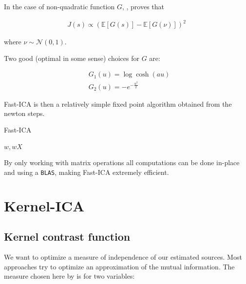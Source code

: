 \documentclass[a4paper,BCOR=5mm,oneside,openany]{scrreprt}
\newcommand*\diag{\mathop{}\!\mathrm{diag}}
\begin{document}
In the case of non-quadratic function $G$, \cite{Hyvarinen1998}, proves that 

\begin{align*}
	J(s) \propto \left( \mathbb{E} \left[G(s) \right] - \mathbb{E} \left[ G(\nu) \right] \right)^2
\end{align*}

where $\nu \sim \mathcal{N}(0,1)$.

Two good (optimal in some sense) choices for $G$ are:

\begin{align*}
	&G_1 (u) = \log \cosh (a u) \\
	&G_2 (u) = −e^{-\frac{u^2}{2}}
\end{align*}

Fast-ICA is then a relatively simple fixed point algorithm obtained from the newton steps.

\begin{algorithm}
\caption{Fast-ICA} \label{fastica}
\begin{algorithmic}
    
    
    \While{ $1 - \min(\lvert \diag(w_i w_{i-1}^\intercal) \rvert) > \epsilon$ }
    \EndWhile
    \State \Return $w, w X$
    \EndProcedure
\end{algorithmic}    
\end{algorithm}

By only working with matrix operations all computations can be done in-place and using a \texttt{BLAS}, making Fast-ICA extremely efficient.

\chapter{Kernel-ICA}

\section{Kernel contrast function}

We want to optimize a measure of independence of our estimated sources. Most approaches try to optimize an approximation of the mutual information. The measure chosen here by \cite{Bach2002} is for two variables:
\end{document}
